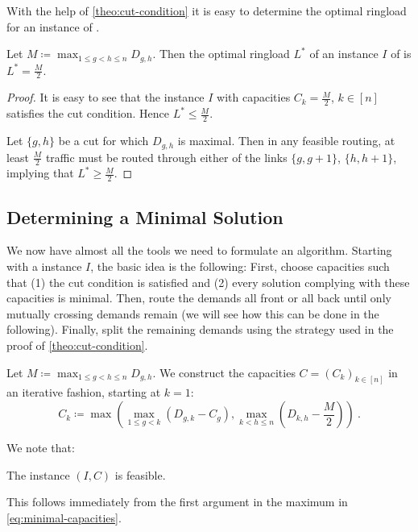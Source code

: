 With the help of \cref{theo:cut-condition} it is easy to determine the optimal ringload for an instance of \RRL.
\begin{corollary}
	\label{cor:ringload}
	Let $M \coloneqq \max_{1 \leq g < h \leq n} D_{g, h}$.
	Then the optimal ringload $L^\ast$ of an instance $I$ of \RRL is $L^\ast = \frac{M}{2}$.
\end{corollary}
\begin{proof}
	It is easy to see that the instance $I$ with capacities $C_k = \frac{M}{2}$, $k \in [n]$ satisfies the cut condition.
	Hence $L^\ast \leq \frac{M}{2}$.
	
	Let $\{g, h\}$ be a cut for which $D_{g, h}$ is maximal.
	Then in any feasible routing, at least $\frac{M}{2}$ traffic must be routed through either of the links $\{g, g+1\}$, $\{h, h+1\}$, implying that $L^\ast \geq \frac{M}{2}$.
\end{proof}
\subsection{Determining a Minimal Solution}

We now have almost all the tools we need to formulate an algorithm.
Starting with a \RRL instance $I$, the basic idea is the following:
First, choose capacities such that (1) the cut condition is satisfied and (2) every solution complying with these capacities is minimal.
Then, route the demands all front or all back until only mutually crossing demands remain (we will see how this can be done in the following).
Finally, split the remaining demands using the strategy used in the proof of \cref{theo:cut-condition}.

Let $M \coloneqq \max_{1 \leq g < h \leq n} D_{g, h}$.
We construct the capacities $C = (C_k)_{k \in [n]}$ in an iterative fashion, starting at $k = 1$:
\begin{equation}
	\label{eq:minimal-capacities}
	C_k \coloneqq \max \left(\max_{1 \leq g < k}(D_{g, k} - C_g), \max_{k < h \leq n}(D_{k, h} - \frac{M}{2})\right) \ .
\end{equation}

We note that:
\begin{proposition}
	The instance $(I, C)$ is feasible.
\end{proposition}
This follows immediately from the first argument in the maximum in \cref{eq:minimal-capacities}.

